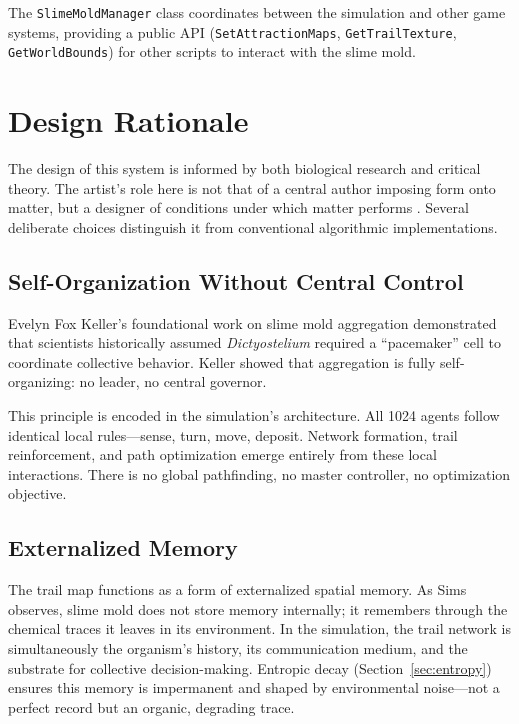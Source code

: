 \documentclass[12pt, titlepage]{article}
\begin{document}
The \texttt{SlimeMoldManager} class coordinates between the simulation and
other game systems, providing a public API (\texttt{SetAttractionMaps},
\texttt{GetTrailTexture}, \texttt{GetWorldBounds}) for other scripts to
interact with the slime mold.

\section{Design Rationale}
\label{sec:rationale}

The design of this system is informed by both biological research and critical
theory. The artist's role here is not that of a central author imposing form
onto matter, but a designer of conditions under which matter performs
\cite{adamatzky2016}. Several deliberate choices distinguish it from
conventional algorithmic implementations.

\subsection{Self-Organization Without Central Control}

Evelyn Fox Keller's foundational work on slime mold aggregation \cite{keller1983}
demonstrated that scientists historically assumed \textit{Dictyostelium}
required a ``pacemaker'' cell to coordinate collective behavior. Keller showed
that aggregation is fully self-organizing: no leader, no central governor.

This principle is encoded in the simulation's architecture. All 1024 agents
follow identical local rules---sense, turn, move, deposit. Network formation,
trail reinforcement, and path optimization emerge entirely from these local
interactions. There is no global pathfinding, no master controller, no
optimization objective.

\subsection{Externalized Memory}

The trail map functions as a form of externalized spatial memory. As Sims
\cite{sims2021} observes, slime mold does not store memory internally; it
remembers through the chemical traces it leaves in its environment. In the
simulation, the trail network is simultaneously the organism's history, its
communication medium, and the substrate for collective decision-making.
Entropic decay (Section~\ref{sec:entropy}) ensures this memory is impermanent
and shaped by environmental noise---not a perfect record but an organic,
degrading trace.
\end{document}
